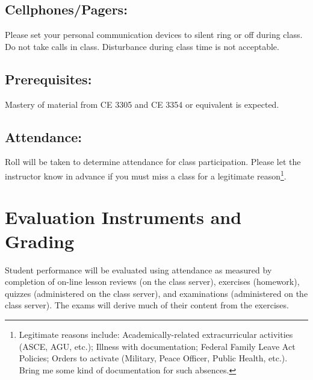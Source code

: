 \documentclass[12pt]{article}
\begin{document}
\subsection*{Cellphones/Pagers:}
Please set your personal communication devices to silent ring or off during class. 
Do not take calls in class. Disturbance during class time is not acceptable.

\subsection*{Prerequisites:} 
Mastery of material from CE 3305 and CE 3354 or equivalent is expected.

\subsection*{Attendance:} Roll will be taken to determine attendance for class participation.  Please let the instructor know in advance if you must miss a class for a legitimate reason\footnote{Legitimate reasons include: Academically-related extracurricular activities (ASCE, AGU, etc.); Illness with documentation; Federal Family Leave Act Policies; Orders to activate (Military, Peace Officer, Public Health, etc.).  Bring me some kind of documentation for such absences.}. 

\section*{Evaluation Instruments and Grading}
Student performance will be evaluated using attendance as measured by completion of on-line lesson reviews (on the class server), exercises (homework), quizzes (administered on the class server), and examinations  (administered on the class server).   The exams will derive much of their content from the exercises.  %

\end{document}
